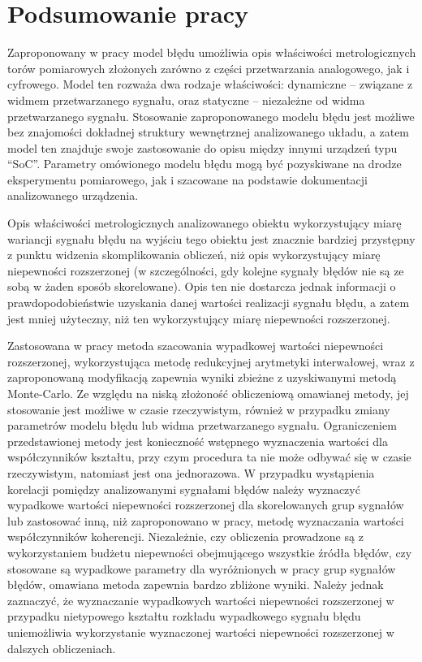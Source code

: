 \chapter{Podsumowanie pracy}

Zaproponowany w pracy model błędu umożliwia opis właściwości metrologicznych torów pomiarowych złożonych zarówno z części przetwarzania analogowego, jak i cyfrowego. Model ten rozważa dwa rodzaje właściwości: dynamiczne -- związane z widmem przetwarzanego sygnału, oraz statyczne -- niezależne od widma przetwarzanego sygnału. Stosowanie zaproponowanego modelu błędu jest możliwe bez znajomości dokładnej struktury wewnętrznej analizowanego układu, a zatem model ten znajduje swoje zastosowanie do opisu między innymi urządzeń typu \enquote{SoC}. Parametry omówionego modelu błędu mogą być pozyskiwane na drodze eksperymentu pomiarowego, jak i szacowane na podstawie dokumentacji analizowanego urządzenia.

Opis właściwości metrologicznych analizowanego obiektu wykorzystujący miarę wariancji sygnału błędu na wyjściu tego obiektu jest znacznie bardziej przystępny z punktu widzenia skomplikowania obliczeń, niż opis wykorzystujący miarę niepewności rozszerzonej (w szczególności, gdy kolejne sygnały błędów nie są ze sobą w żaden sposób skorelowane). Opis ten nie dostarcza jednak informacji o prawdopodobieństwie uzyskania danej wartości realizacji sygnału błędu, a zatem jest mniej użyteczny, niż ten wykorzystujący miarę niepewności rozszerzonej.

Zastosowana w pracy metoda szacowania wypadkowej wartości niepewności rozszerzonej, wykorzystująca metodę redukcyjnej arytmetyki interwałowej, wraz z zaproponowaną modyfikacją zapewnia wyniki zbieżne z uzyskiwanymi metodą Monte-Carlo. Ze względu na niską złożoność obliczeniową omawianej metody, jej stosowanie jest możliwe w czasie rzeczywistym, również w przypadku zmiany parametrów modelu błędu lub widma przetwarzanego sygnału. Ograniczeniem przedstawionej metody jest konieczność wstępnego wyznaczenia wartości dla współczynników kształtu, przy czym procedura ta nie może odbywać się w czasie rzeczywistym, natomiast jest ona jednorazowa. W przypadku wystąpienia korelacji pomiędzy analizowanymi sygnałami błędów należy wyznaczyć wypadkowe wartości niepewności rozszerzonej dla skorelowanych grup sygnałów lub zastosować inną, niż zaproponowano w pracy, metodę wyznaczania wartości współczynników koherencji. Niezależnie, czy obliczenia prowadzone są z wykorzystaniem budżetu niepewności obejmującego wszystkie źródła błędów, czy stosowane są wypadkowe parametry dla wyróżnionych w pracy grup sygnałów błędów, omawiana metoda zapewnia bardzo zbliżone wyniki. Należy jednak zaznaczyć, że wyznaczanie wypadkowych wartości niepewności rozszerzonej w przypadku nietypowego kształtu rozkładu wypadkowego sygnału błędu uniemożliwia wykorzystanie wyznaczonej wartości niepewności rozszerzonej w dalszych obliczeniach.

